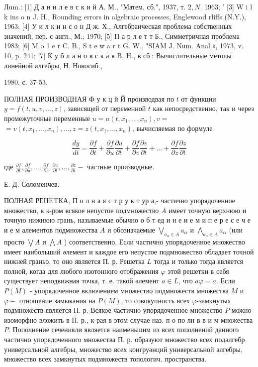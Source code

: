 \documentclass[10pt]{article}
\begin{document}
Лum.: [1] Д а н и л е в с к и й А. М., "Матем. сб.", 1937, т. $2, N$. 1963; ' [3] W i l k ins o n J. H., Rounding errors in algebraic processes, Englewood rliffs (N.Y.), 1963; [4] У и л к и н с о н Д ж. Х., Алгебраическая проблема собственных значений, пер. с англ., М.; 1970; [5] П а р л е т т Б., Симметричная проблема 1983; [6] M o 1 e r C. B., S t e w a r t G. W., "SIAM J. Num. Anal.», 1973, v. 10, p. 241; [7] К у б л а н о в с к а я B. H., в сб.: Вычислительные метолы линейной алгебры, Н. Новосиб.,

1980, с. 37-53.



ПОЛНАЯ ПРОИЗВОДНАЯ Ф у к ц й Й производвая по $t$ от функции $y=f(t, u, v, \ldots, z)$, зависящей от переменной $t$ как непосредственно, так и через промежуточные переменные $u=u\left(t, x_{1}, \ldots, x_{n}\right), v=$ $=v\left(t, x_{1}, \ldots, x_{n}\right), \ldots, z=z\left(t, x_{1}, \ldots, x_{n}\right)$, вычисляемая по формуле



\[

\frac{d y}{d t}=\frac{\partial f}{\partial t}+\frac{\partial f}{\partial u} \frac{\partial u}{\partial t}+\frac{\partial f}{\partial v} \frac{\partial v}{\partial t}+\ldots+\frac{\partial f}{\partial z} \frac{\partial z}{\partial t}

\]



где $\frac{\partial f}{\partial t}, \frac{\partial f}{\partial u}, \ldots, \frac{\partial f}{\partial z}, \frac{\partial u}{\partial t}, \ldots, \frac{\partial z}{\partial t}-$ частные производные.



Е. Д. Соломенчев.



ПОЛНАЯ РЕIIETКА, П о л н а я с т р у к т ур а,- частично упорядоченное множество, в к-ром всякое непустое подмножество $A$ имеет точную верхнюю и точную нижнюю грань, называемые обычно о б т ед и н е и е м и п е р е с е ч е и е м алементов подмножества $A$ и обозначаемые $\bigvee_{a_{\alpha} \in A} a_{\alpha}$ и $\bigwedge_{a_{\alpha} \in A} a_{\alpha}$ (или просто $\bigvee A$ и $\bigwedge A$ ) соответственно. Если частично упорядоченное множество имеет наибольший әлемент и каждое его непустое подмножество обладает точной нижней граньо, то оно является П. р. Решетка $L$ тогда и только тогда является полной, когда для любого изотонного отображения $\varphi$ этой решетки в себя существует неподвижная точка, т. е. такой әлемент $a \in L$, что $a \varphi=a$. Если $P(M)$ - упорядоченное включением множество подмножеств множества $M$ и $\varphi-$ отношение замыкания на $P(M)$, то совокупность всех $\varphi$-замкнутых подмножеств является П. р. Всякое частично упорядоченное множество $P$ можно изоморфно вложить в П. р., к-рая в этом случае наз. п о по лн в в и м множества $P$. Пополнение сеченияли является наименьшим из всех пополнений данного частично упорядоченного множества П. р. образуют множество всех подалгебр универсальной алгебры, множество всех конгруәнций универсальной алгебры, множество всех замкнутых подмножеств топологич. пространства.
\end{document}
